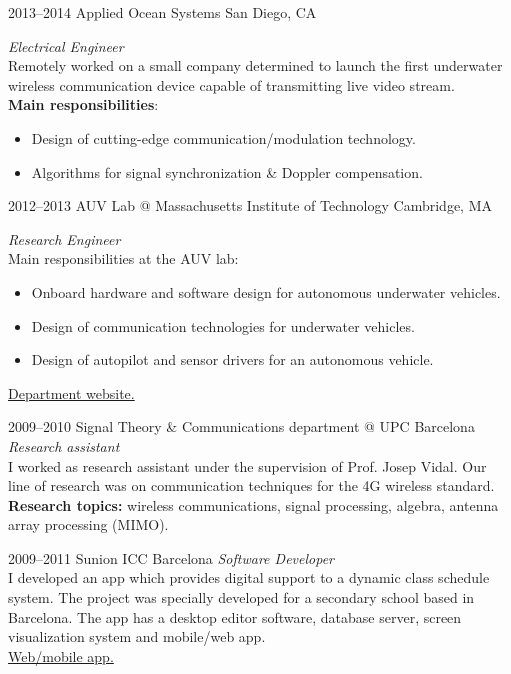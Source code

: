 \documentclass[]{friggeri-cv} %
\begin{document}
\begin{entrylist}

\entry
{2013--2014}
{Applied Ocean Systems}
{San Diego, CA}
{%
\emph{Electrical Engineer} \\
Remotely worked on a small company determined to launch the first
underwater wireless communication device capable of transmitting live
video stream. \\
{\bf Main responsibilities}:
  \begin{itemize}
    \item Design of cutting-edge communication/modulation technology.
    \item Algorithms for signal synchronization \& Doppler compensation.
  \end{itemize}
}


\entry
{2012--2013}
{AUV Lab @ Massachusetts Institute of Technology}
{Cambridge, MA}
{%
\emph{Research Engineer} \\
Main responsibilities at the AUV lab:
  \begin{itemize}
    \item Onboard hardware and software design for autonomous
      underwater vehicles.
    \item Design of communication technologies for underwater
      vehicles.
    \item Design of autopilot and sensor drivers for an autonomous vehicle.
  \end{itemize}
\href{http://seagrant.mit.edu}{{\FA\faExternalLink} Department website.}
}


\entry
{2009--2010}
{Signal Theory \& Communications department @ UPC}
{Barcelona}
{%
\emph{Research assistant} \\
I worked as research assistant under the supervision of Prof. Josep
Vidal. Our line of research was on communication techniques for the 4G
wireless standard. \\
{\bf Research topics:} wireless communications, signal processing,
algebra, antenna array processing (MIMO).
}



\entry
{2009--2011}
{Sunion ICC}
{Barcelona}
{%
\emph{Software Developer} \\
I developed an app which provides digital support to a dynamic class
schedule system. The project was specially developed for a
secondary school based in Barcelona. The app has a desktop editor
software, database server, screen visualization system and mobile/web
app. \\
\href{http://horari.sunion.net}{{\FA\faExternalLink} Web/mobile app.}
}


\end{entrylist}
\end{document}
